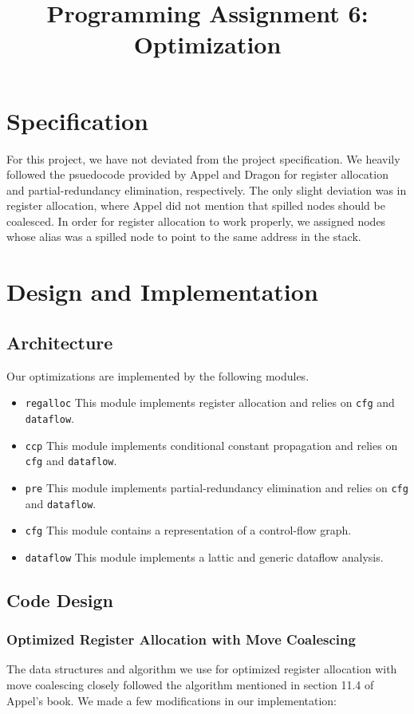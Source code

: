\documentclass{hw} \title{Programming Assignment 6:\\ Optimization}
\begin{document}
\section{Specification}\label{sec:specification} For this project, we have not
deviated from the project specification. We heavily followed the psuedocode
provided by Appel and Dragon for register allocation and partial-redundancy
elimination, respectively. The only slight deviation was in register
allocation, where Appel did not mention that spilled nodes should be coalesced.
In order for register allocation to work properly, we assigned nodes whose
alias was a spilled node to point to the same address in the stack.

\section{Design and Implementation}\label{sec:design} \subsection{Architecture}
Our optimizations are implemented by the following modules.  \begin{itemize}
  \item \texttt{regalloc} This module implements register allocation and relies
    on \texttt{cfg} and \texttt{dataflow}.

  \item \texttt{ccp} This module implements conditional constant propagation
    and relies on \texttt{cfg} and \texttt{dataflow}.

  \item \texttt{pre} This module implements partial-redundancy elimination and
    relies on \texttt{cfg} and \texttt{dataflow}.

  \item \texttt{cfg} This module contains a representation of a control-flow
    graph.

  \item \texttt{dataflow} This module implements a lattic and generic dataflow
analysis.  \end{itemize}

\subsection{Code Design}

\subsubsection{Optimized Register Allocation with Move Coalescing} The data
structures and algorithm we use for optimized register allocation with move
coalescing closely followed the algorithm mentioned in section 11.4 of Appel's
book. We made a few modifications in our implementation:
\end{document}
